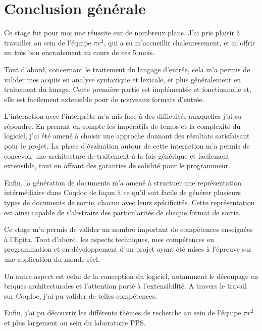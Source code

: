 \documentclass[a4paper, 11pt]{report}
\newcommand{\pir}[0]{\textbf{$\pi r^2$}\xspace}
\begin{document}
\chapter{Conclusion générale}
Ce stage fut pour moi une réussite sur de nombreux plans. J'ai pris plaisir
à travailler au sein de l'équipe \pir, qui a su m'accueillir chaleuresement, et
m'offrir un très bon encradement au cours de ces 5 mois.

Tout d'abord, concernant le traitement du langage d'entrée, cela m'a permis
de valider mes acquis en analyse syntaxique et lexicale, et plus généralement
en traitement du lanage. Cette première partie est implémentée et fonctionnelle
et, elle est facilement extensible pour de nouveaux formats d'entrée.

L'interaction avec l'interprète m'a mis face à des difficultés auxquelles j'ai
su répondre. En prenant en compte les impératifs de temps et la complexité du
logiciel, j'ai été amené à choisir une approche donnant des résultats
satisfaisant pour le projet. La phase d'évaluation autour de cette interaction
m'a permis de concevoir une architecture de traitement à la fois générique et
facilement extensible, tout en offrant des garanties de solidité pour le
programmeur.

Enfin, la génération de documents m'a amené à structuer une représentation
intérmédiaire dans Coqdoc de façon à ce qu'il soit facile de générer plusieurs
types de documents de sortie, chacun avec leurs spécificités. Cette représentation
est ainsi capable de s'abstraire des particularités de chaque format de sortie.

Ce stage m'a permis de valider un nombre important de compétences enseignées
à l'Epita. Tout d'abord, les aspects techniques, mes compétences en
programmation et en développement d'un projet ayant été mises à l'épreuve sur
une application du monde réel.

Un autre aspect est celui de la conception du logiciel, notamment le découpage
en briques architecturales et l'attention porté à l'extensibilité. A travers
le travail sur Coqdoc, j'ai pu valider de telles compétences.

Enfin, j'ai pu découvrir les différents thèmes de recherche au sein de l'équipe
\pir et plus largement au sein du laboratoire PPS.


\end{document}

